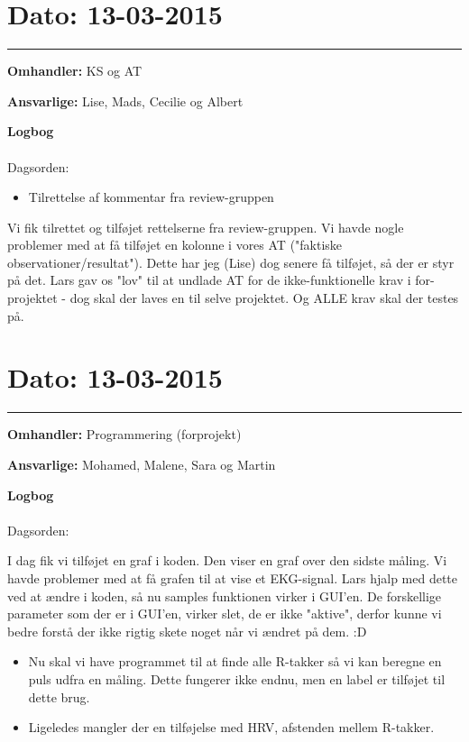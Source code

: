 \section{Dato: 13-03-2015}
\hrule

\textbf{Omhandler:} KS og AT

\textbf{Ansvarlige:} Lise, Mads, Cecilie og Albert

\textbf{Logbog}
\\
\\
Dagsorden:
\begin{itemize}
	\item Tilrettelse af kommentar fra review-gruppen
\end{itemize}

Vi fik tilrettet og tilføjet rettelserne fra review-gruppen. Vi havde nogle problemer med at få tilføjet en kolonne i vores AT ("faktiske observationer/resultat"). Dette har jeg (Lise) dog senere få tilføjet, så der er styr på det. 
Lars gav os "lov" til at undlade AT for de ikke-funktionelle krav i for-projektet - dog skal der laves en til selve projektet. Og ALLE krav skal der testes på. 


\section{Dato: 13-03-2015}
\hrule

\textbf{Omhandler:} Programmering (forprojekt)

\textbf{Ansvarlige:} Mohamed, Malene, Sara og Martin

\textbf{Logbog}
\\
\\
Dagsorden:

	I dag fik vi tilføjet en graf i koden. Den viser en graf over den sidste måling. Vi havde problemer med at få grafen til at vise et EKG-signal. Lars hjalp med dette ved at ændre i koden, så nu samples funktionen virker i GUI'en. De forskellige parameter som der er i GUI'en, virker slet, de er ikke "aktive", derfor kunne vi bedre forstå der ikke rigtig skete noget når vi ændret på dem. :D
\begin{itemize}
	\item  Nu skal vi have programmet til at finde alle R-takker så vi kan beregne en puls udfra en måling. Dette fungerer ikke endnu, men en label er tilføjet til dette brug.
	
	\item Ligeledes mangler der en tilføjelse med HRV, afstenden mellem R-takker.
\end{itemize}
	
